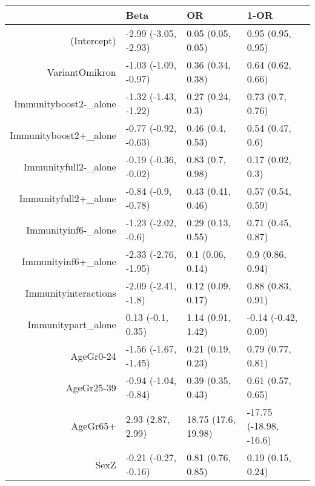 \begin{table}[ht]
\centering
\begin{tabular}{rlll}
  \hline
 & Beta & OR & 1-OR \\ 
  \hline
(Intercept) & -2.99 (-3.05, -2.93) & 0.05 (0.05, 0.05) & 0.95 (0.95, 0.95) \\ 
  VariantOmikron & -1.03 (-1.09, -0.97) & 0.36 (0.34, 0.38) & 0.64 (0.62, 0.66) \\ 
  Immunityboost2-\_alone & -1.32 (-1.43, -1.22) & 0.27 (0.24, 0.3) & 0.73 (0.7, 0.76) \\ 
  Immunityboost2+\_alone & -0.77 (-0.92, -0.63) & 0.46 (0.4, 0.53) & 0.54 (0.47, 0.6) \\ 
  Immunityfull2-\_alone & -0.19 (-0.36, -0.02) & 0.83 (0.7, 0.98) & 0.17 (0.02, 0.3) \\ 
  Immunityfull2+\_alone & -0.84 (-0.9, -0.78) & 0.43 (0.41, 0.46) & 0.57 (0.54, 0.59) \\ 
  Immunityinf6-\_alone & -1.23 (-2.02, -0.6) & 0.29 (0.13, 0.55) & 0.71 (0.45, 0.87) \\ 
  Immunityinf6+\_alone & -2.33 (-2.76, -1.95) & 0.1 (0.06, 0.14) & 0.9 (0.86, 0.94) \\ 
  Immunityinteractions & -2.09 (-2.41, -1.8) & 0.12 (0.09, 0.17) & 0.88 (0.83, 0.91) \\ 
  Immunitypart\_alone & 0.13 (-0.1, 0.35) & 1.14 (0.91, 1.42) & -0.14 (-0.42, 0.09) \\ 
  AgeGr0-24 & -1.56 (-1.67, -1.45) & 0.21 (0.19, 0.23) & 0.79 (0.77, 0.81) \\ 
  AgeGr25-39 & -0.94 (-1.04, -0.84) & 0.39 (0.35, 0.43) & 0.61 (0.57, 0.65) \\ 
  AgeGr65+ & 2.93 (2.87, 2.99) & 18.75 (17.6, 19.98) & -17.75 (-18.98, -16.6) \\ 
  SexZ & -0.21 (-0.27, -0.16) & 0.81 (0.76, 0.85) & 0.19 (0.15, 0.24) \\ 
   \hline
\end{tabular}
\end{table}

